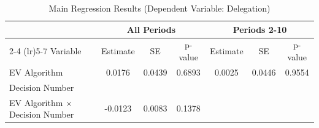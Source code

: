 \begin{table}[htbp]
\centering
\caption{Main Regression Results (Dependent Variable: Delegation)}
\begin{tabular}{lcccccc}
\toprule
 & \multicolumn{3}{c}{All Periods} & \multicolumn{3}{c}{Periods 2-10} \\
\cmidrule(lr){2-4} \cmidrule(lr){5-7}
Variable & Estimate & SE & p-value & Estimate & SE & p-value \\
\midrule
EV Algorithm & 0.0176 & 0.0439 & 0.6893 & 0.0025 & 0.0446 & 0.9554 \\
Decision Number &  &  &  &  &  &  \\
EV Algorithm $\times$ Decision Number & -0.0123 & 0.0083 & 0.1378 &  &  &  \\
\bottomrule
\end{tabular}
\label{tab:regression}
\end{table}